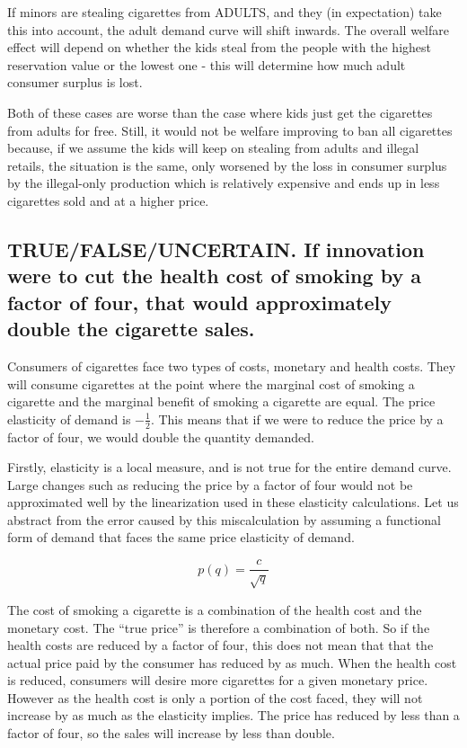 \documentclass{article}
\begin{document}
If minors are stealing cigarettes from ADULTS, and they (in
expectation) take this into account, the adult demand curve will shift
inwards. The overall welfare effect will depend on whether the kids steal from
the people with the highest reservation value or the lowest one - this
will determine how much adult consumer surplus is lost.

Both of these cases are worse than the case where kids just get the
cigarettes from adults for free. Still, it would not be welfare
improving to ban all cigarettes because, if we assume the kids will
keep on stealing from adults and illegal retails, the situation is the
same, only worsened by the loss in consumer surplus by the
illegal-only production which is relatively expensive and ends up in
less cigarettes sold and at a higher price.

\subsection{TRUE/FALSE/UNCERTAIN. If innovation were to cut the health
  cost of smoking by a factor of four, that would approximately double
  the cigarette sales.}

Consumers of cigarettes face two types of costs, monetary and health
costs. They will consume cigarettes at the point where the marginal
cost of smoking a cigarette and the marginal benefit of smoking a
cigarette are equal. The price elasticity of demand is
$-\frac{1}{2}$. This means that if we were to reduce the price by a
factor of four, we would double the quantity demanded.

Firstly, elasticity is a local measure, and is not true for the entire
demand curve. Large changes such as reducing the price by a factor of
four would not be approximated well by the linearization used in these
elasticity calculations. Let us abstract from the error caused by this
miscalculation by assuming a functional form of demand that faces the
same price elasticity of demand.

\begin{equation*}
  p(q) = \frac{c}{\sqrt{q}}
\end{equation*}

The cost of smoking a cigarette is a combination of the health cost
and the monetary cost. The ``true price'' is therefore a combination
of both. So if the health costs are reduced by a factor of four, this
does not mean that that the actual price paid by the consumer has
reduced by as much. When the health cost is reduced, consumers will
desire more cigarettes for a given monetary price. However as the
health cost is only a portion of the cost faced, they will not
increase by as much as the elasticity implies. The price has reduced
by less than a factor of four, so the sales will increase by less than
double.
\end{document}
